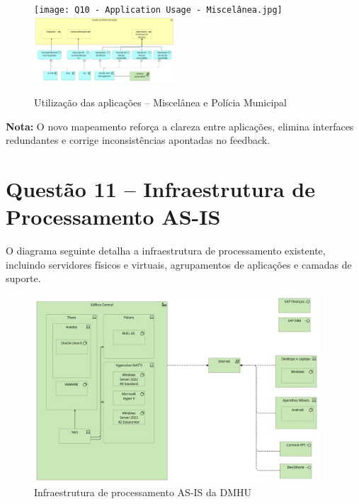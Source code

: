 \documentclass[12pt,a4paper,final]{article}
\begin{document}
    \begin{figure}[H]
        \centering
        \texttt{[image: Q10 - Application Usage - Miscelânea.jpg]}
        \includegraphics[width=0.47\textwidth]{Q10 - Application Usage - Municipal Police.jpg}
        \caption{Utilização das aplicações – Miscelânea e Polícia Municipal}
        \label{fig:q10-usage-misc-pm}
    \end{figure}

    \textbf{Nota:} O novo mapeamento reforça a clareza entre aplicações, elimina interfaces redundantes e corrige inconsistências apontadas no feedback.

    \section*{Questão 11 – Infraestrutura de Processamento AS-IS}

    O diagrama seguinte detalha a infraestrutura de processamento existente, incluindo servidores físicos e virtuais, agrupamentos de aplicações e camadas de suporte.

    \begin{figure}[H]
        \centering
        \includegraphics[width=0.95\textwidth]{Q11 - Processing Infraestructure As-Is.jpg}
        \caption{Infraestrutura de processamento AS-IS da DMHU}
        \label{fig:q11-processing}
    \end{figure}
\end{document}
